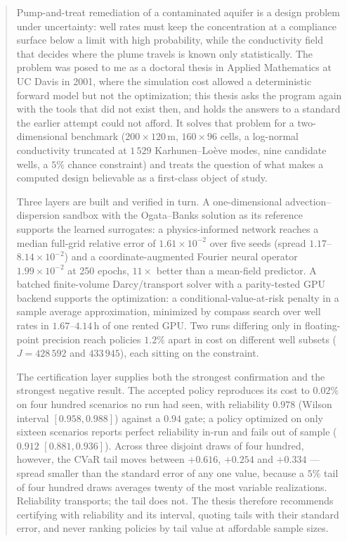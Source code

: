 
\begin{abstract}
\noindent
Pump-and-treat remediation of a contaminated aquifer is a design problem under
uncertainty: well rates must keep the concentration at a compliance surface below
a limit with high probability, while the conductivity field that decides where
the plume travels is known only statistically. The problem was
posed to me as a doctoral thesis in Applied Mathematics at UC Davis in 2001,
where the simulation cost allowed a deterministic forward model but not the
optimization; this thesis asks the program again with the tools that did not
exist then, and holds the answers to a standard the earlier attempt could not
afford. It solves that problem
for a two-dimensional benchmark ($200\times120$\,m, $160\times96$ cells, a
log-normal conductivity truncated at $1\,529$ Karhunen--Lo\`eve modes, nine
candidate wells, a $5\%$ chance constraint) and treats the question of what makes
a computed design believable as a first-class object of study.

Three layers are built and verified in turn. A one-dimensional
advection--dispersion sandbox with the Ogata--Banks solution as its reference
supports the learned surrogates: a physics-informed network reaches a median
full-grid relative error of $1.61\times10^{-2}$ over five seeds (spread
$1.17$--$8.14\times10^{-2}$) and a coordinate-augmented Fourier neural operator
$1.99\times10^{-2}$ at 250 epochs, $11\times$ better than a mean-field predictor.
A batched finite-volume Darcy/transport solver with a parity-tested GPU backend
supports the optimization: a conditional-value-at-risk penalty in a sample
average approximation, minimized by compass search over well rates in
$1.67$--$4.14$\,h of one rented GPU. Two runs differing only in floating-point
precision reach policies $1.2\%$ apart in cost on different well subsets
($J = 428\,592$ and $433\,945$), each sitting on the constraint.

The certification layer supplies both the strongest confirmation and the
strongest negative result. The accepted policy reproduces its cost to $0.02\%$ on
four hundred scenarios no run had seen, with reliability $0.978$ (Wilson interval
$[0.958,0.988]$) against a $0.94$ gate; a policy optimized on only sixteen
scenarios reports perfect reliability in-run and fails out of sample
($0.912$ $[0.881,0.936]$). Across three disjoint draws of four hundred, however,
the CVaR tail moves between $+0.616$, $+0.254$ and $+0.334$ --- spread smaller
than the standard error of any one value, because a $5\%$ tail of four hundred
draws averages twenty of the most variable realizations. Reliability transports;
the tail does not. The thesis therefore recommends certifying with reliability
and its interval, quoting tails with their standard error, and never ranking
policies by tail value at affordable sample sizes.


\end{abstract}
